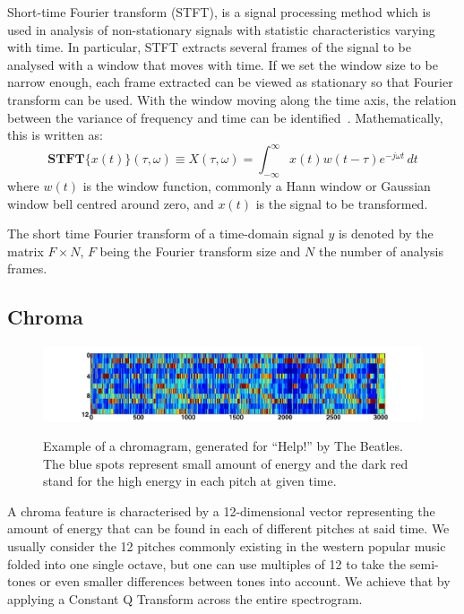 Short-time Fourier transform (STFT), is a signal processing method which is used in analysis of non-stationary signals with statistic characteristics varying with time.
In particular, STFT extracts several frames of the signal to be analysed with a window that moves with time. If we set the window size to be narrow enough, each frame extracted can be viewed as stationary so that Fourier transform can be used. With the window moving along the time axis, the relation between the variance of frequency and time can be identified~\cite{STFT}.
Mathematically, this is written as:
\begin{equation}
\mathbf{STFT}\{x(t)\}(\tau,\omega) \equiv X(\tau, \omega) = \int_{-\infty}^{\infty} x(t) w(t-\tau) e^{-j \omega t} \, dt 
\end{equation}
where $w(t)$ is the window function, commonly a Hann window or Gaussian window bell centred around zero, and $x(t)$ is the signal to be transformed. 

The short time Fourier transform of a time-domain signal $y$ is denoted by the matrix $F \times N$, $F$ being the Fourier transform size and $N$ the number of analysis frames.

\vspace{10pt}

\subsection{Chroma}

\begin{figure}       
      \centering
                \includegraphics[width=\textwidth]{Figures/chromagram_example}
			   \vspace{15pt}
			   \label{fig:chromaexample}
			   \caption{Example of a chromagram, generated for ``Help!'' by The Beatles. The blue spots represent small amount of energy and the dark red stand for the high energy in each pitch at given time.}
\end{figure}

A chroma feature is characterised by a 12-dimensional vector representing the amount of energy that can be found in each of different pitches at said time. We usually consider the 12 pitches commonly existing in the western popular music folded into one single octave, but one can use multiples of 12 to take the semi-tones or even smaller differences between tones into account. We achieve that by applying a Constant Q Transform across the entire spectrogram. 

